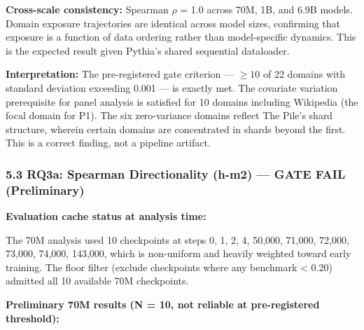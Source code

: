 \textbf{Cross-scale consistency:} Spearman $\rho$ = 1.0 across 70M, 1B, and 6.9B models. Domain exposure trajectories are identical across model sizes, confirming that exposure is a function of data ordering rather than model-specific dynamics. This is the expected result given Pythia's shared sequential dataloader.

\textbf{Interpretation:} The pre-registered gate criterion --- $\geq 10$ of 22 domains with standard deviation exceeding 0.001 --- is exactly met. The covariate variation prerequisite for panel analysis is satisfied for 10 domains including Wikipedia (the focal domain for P1). The six zero-variance domains reflect The Pile's shard structure, wherein certain domains are concentrated in shards beyond the first. This is a correct finding, not a pipeline artifact.

\subsubsection{5.3 RQ3a: Spearman Directionality (h-m2) --- GATE FAIL (Preliminary)}

\textbf{Evaluation cache status at analysis time:}

\begin{table}[htbp]
\centering
{}
\end{table}

The 70M analysis used 10 checkpoints at steps {0, 1, 2, 4, 50,000, 71,000, 72,000, 73,000, 74,000, 143,000}, which is non-uniform and heavily weighted toward early training. The floor filter (exclude checkpoints where any benchmark < 0.20) admitted all 10 available 70M checkpoints.

\textbf{Preliminary 70M results (N = 10, not reliable at pre-registered threshold):}

\begin{table}[htbp]
\centering
{}
\end{table}

